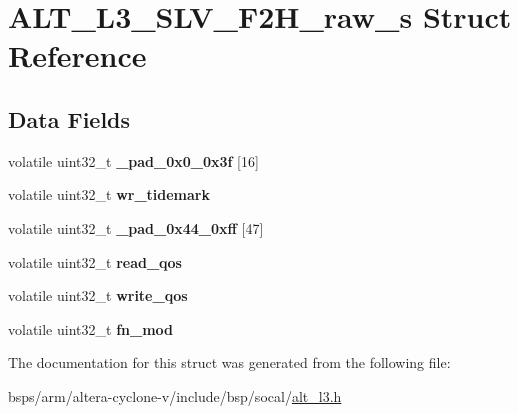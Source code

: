 \hypertarget{structALT__L3__SLV__F2H__raw__s}{}\section{A\+L\+T\+\_\+\+L3\+\_\+\+S\+L\+V\+\_\+\+F2\+H\+\_\+raw\+\_\+s Struct Reference}
\label{structALT__L3__SLV__F2H__raw__s}
\subsection*{Data Fields}
\begin{DoxyCompactItemize}
\item 
\mbox{\label{structALT__L3__SLV__F2H__raw__s_a9ceff5321122235c67773e8a20ed538c}} 
volatile uint32\+\_\+t {\bfseries \+\_\+pad\+\_\+0x0\+\_\+0x3f} \mbox{[}16\mbox{]}
\item 
\mbox{\label{structALT__L3__SLV__F2H__raw__s_a942baa70416fddf748c0af34d996e61f}} 
volatile uint32\+\_\+t {\bfseries wr\+\_\+tidemark}
\item 
\mbox{\label{structALT__L3__SLV__F2H__raw__s_aa1fb820f13ae663d986b27c769203b3d}} 
volatile uint32\+\_\+t {\bfseries \+\_\+pad\+\_\+0x44\+\_\+0xff} \mbox{[}47\mbox{]}
\item 
\mbox{\label{structALT__L3__SLV__F2H__raw__s_a51cd625934a0139f0317b6063ac4d8cd}} 
volatile uint32\+\_\+t {\bfseries read\+\_\+qos}
\item 
\mbox{\label{structALT__L3__SLV__F2H__raw__s_a6055127662e3008e053b1b534db739d1}} 
volatile uint32\+\_\+t {\bfseries write\+\_\+qos}
\item 
\mbox{\label{structALT__L3__SLV__F2H__raw__s_a4c90f9cca5671964f67ae20a7f250003}} 
volatile uint32\+\_\+t {\bfseries fn\+\_\+mod}
\end{DoxyCompactItemize}


The documentation for this struct was generated from the following file\+:\begin{DoxyCompactItemize}
\item 
bsps/arm/altera-\/cyclone-\/v/include/bsp/socal/\mbox{\hyperlink{alt__l3_8h}{alt\+\_\+l3.\+h}}\end{DoxyCompactItemize}
